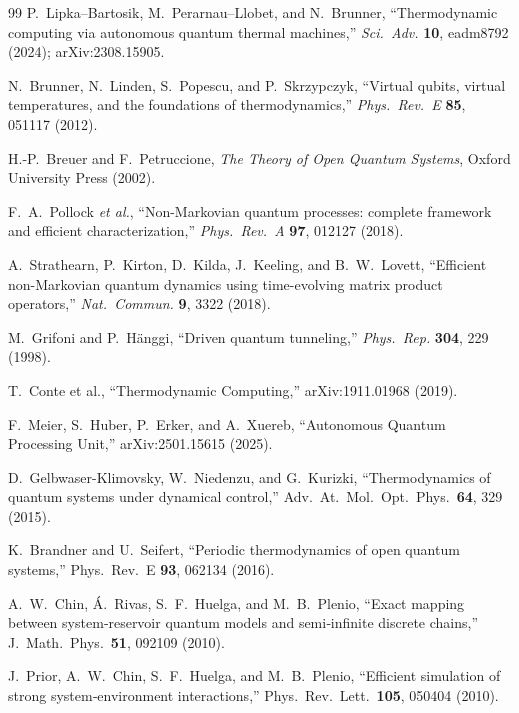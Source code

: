 \documentclass[11pt,a4paper]{article}
\theoremstyle{plain}
\theoremstyle{definition}
\theoremstyle{remark}
\begin{document}
\clearpage
\begin{thebibliography}{99}
 P.~Lipka--Bartosik, M.~Perarnau--Llobet, and
N.~Brunner, ``Thermodynamic computing via autonomous quantum thermal
machines,'' \emph{Sci.\ Adv.} \textbf{10}, eadm8792 (2024);
arXiv:2308.15905.

 N.~Brunner, N.~Linden, S.~Popescu, and
P.~Skrzypczyk, ``Virtual qubits, virtual temperatures, and the
foundations of thermodynamics,'' \emph{Phys.\ Rev.\ E} \textbf{85},
051117 (2012).

 H.-P.~Breuer and F.~Petruccione, \emph{The Theory of
Open Quantum Systems}, Oxford University Press (2002).

 F.~A.~Pollock \emph{et al.}, ``Non-Markovian quantum
processes: complete framework and efficient characterization,''
\emph{Phys.\ Rev.\ A} \textbf{97}, 012127 (2018).

 A.~Strathearn, P.~Kirton, D.~Kilda, J.~Keeling,
and B.~W.~Lovett, ``Efficient non-Markovian quantum dynamics using
time-evolving matrix product operators,'' \emph{Nat.\ Commun.} \textbf{9},
3322 (2018).

 M.~Grifoni and P.~H\"anggi, ``Driven quantum
tunneling,'' \emph{Phys.\ Rep.} \textbf{304}, 229 (1998).

 T.~Conte et al., “Thermodynamic Computing,” arXiv:1911.01968 (2019).

 F.~Meier, S.~Huber, P.~Erker, and A.~Xuereb, “Autonomous Quantum Processing Unit,” arXiv:2501.15615 (2025).

 D.~Gelbwaser-Klimovsky, W.~Niedenzu, and G.~Kurizki, “Thermodynamics of quantum systems under dynamical control,” Adv.\ At.\ Mol.\ Opt.\ Phys.\ \textbf{64}, 329 (2015).

 K.~Brandner and U.~Seifert, “Periodic thermodynamics of open quantum systems,” Phys.\ Rev.\ E \textbf{93}, 062134 (2016).

 A.~W.~Chin, \'{A}.~Rivas, S.~F.~Huelga, and M.~B.~Plenio, “Exact mapping between system‑reservoir quantum models and semi‑infinite discrete chains,” J.\ Math.\ Phys.\ \textbf{51}, 092109 (2010).

 J.~Prior, A.~W.~Chin, S.~F.~Huelga, and M.~B.~Plenio, “Efficient simulation of strong system‑environment interactions,” Phys.\ Rev.\ Lett.\ \textbf{105}, 050404 (2010).


\end{thebibliography}
\end{document}

